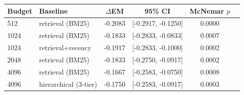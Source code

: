 \begin{tabular}{llcccc}
\toprule
Budget & Baseline & $\Delta$EM & 95\% CI & McNemar $p$ \\
\midrule
512 & retrieval (BM25) & -0.2083 & [-0.2917, -0.1250] & 0.0000 \\
1024 & retrieval (BM25) & -0.1833 & [-0.2833, -0.0833] & 0.0007 \\
1024 & retrieval+recency & -0.1917 & [-0.2833, -0.1000] & 0.0002 \\
2048 & retrieval (BM25) & -0.1833 & [-0.2750, -0.0917] & 0.0002 \\
4096 & retrieval (BM25) & -0.1667 & [-0.2583, -0.0750] & 0.0008 \\
4096 & hierarchical (3-tier) & -0.1750 & [-0.2583, -0.0917] & 0.0003 \\
\bottomrule
\end{tabular}